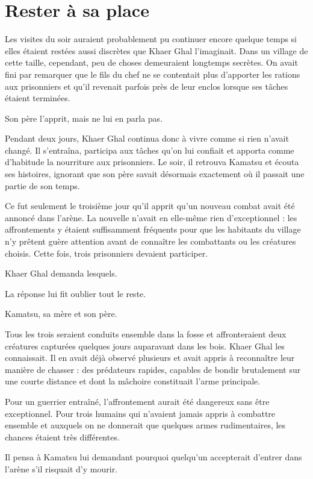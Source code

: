 \chapter{Rester à sa place}
\label{chap:rester-a-sa-place}

Les visites du soir auraient probablement pu continuer encore quelque temps si
elles étaient restées aussi discrètes que Khaer Ghal l'imaginait. Dans un
village de cette taille, cependant, peu de choses demeuraient longtemps
secrètes. On avait fini par remarquer que le fils du chef ne se contentait plus
d'apporter les rations aux prisonniers et qu'il revenait parfois près de leur
enclos lorsque ses tâches étaient terminées.

Son père l'apprit, mais ne lui en parla pas.

Pendant deux jours, Khaer Ghal continua donc à vivre comme si rien n'avait
changé. Il s'entraîna, participa aux tâches qu'on lui confiait et apporta comme
d'habitude la nourriture aux prisonniers. Le soir, il retrouva Kamatsu et
écouta ses histoires, ignorant que son père savait désormais exactement où il
passait une partie de son temps.

Ce fut seulement le troisième jour qu'il apprit qu'un nouveau combat avait été
annoncé dans l'arène. La nouvelle n'avait en elle-même rien d'exceptionnel :
les affrontements y étaient suffisamment fréquents pour que les habitants du
village n'y prêtent guère attention avant de connaître les combattants ou les
créatures choisis. Cette fois, trois prisonniers devaient participer.

Khaer Ghal demanda lesquels.

La réponse lui fit oublier tout le reste.

Kamatsu, sa mère et son père.

Tous les trois seraient conduits ensemble dans la fosse et affronteraient deux
créatures capturées quelques jours auparavant dans les bois. Khaer Ghal les
connaissait. Il en avait déjà observé plusieurs et avait appris à reconnaître
leur manière de chasser : des prédateurs rapides, capables de bondir
brutalement sur une courte distance et dont la mâchoire constituait l'arme
principale.

Pour un guerrier entraîné, l'affrontement aurait été dangereux sans être
exceptionnel. Pour trois humains qui n'avaient jamais appris à combattre
ensemble et auxquels on ne donnerait que quelques armes rudimentaires, les
chances étaient très différentes.

Il pensa à Kamatsu lui demandant pourquoi quelqu'un accepterait d'entrer dans
l'arène s'il risquait d'y mourir.

